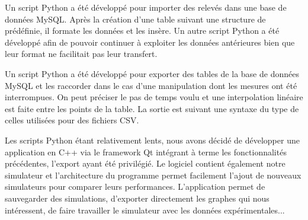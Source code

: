 \documentclass[../PS6_RapportFinal.tex]{subfiles}
\begin{document}

Un script Python a été développé pour importer des relevés dans une base de données MySQL. Après la création d'une table suivant une structure de prédéfinie, il formate les données et les insère.
Un autre script Python a été développé afin de pouvoir continuer à exploiter les données antérieures bien que leur format ne facilitait pas leur transfert.


Un script Python a été développé pour exporter des tables de la base de données MySQL et les raccorder dans le cas d'une manipulation dont les mesures ont été interrompues. On peut préciser le pas de temps voulu et une interpolation linéaire est faite entre les points de la table. La sortie est suivant une syntaxe du type de celles utilisées pour des fichiers CSV.


Les scripts Python étant relativement lents, nous avons décidé de développer une application en C++ via le framework Qt intégrant à terme les fonctionnalités précédentes, l'export ayant été privilégié. Le logiciel contient également notre simulateur et l'architecture du programme permet facilement l'ajout de nouveaux simulateurs pour comparer leurs performances. L'application permet de sauvegarder des simulations, d'exporter directement les graphes qui nous intéressent, de faire travailler le simulateur avec les données expérimentales... 


\end{document}
